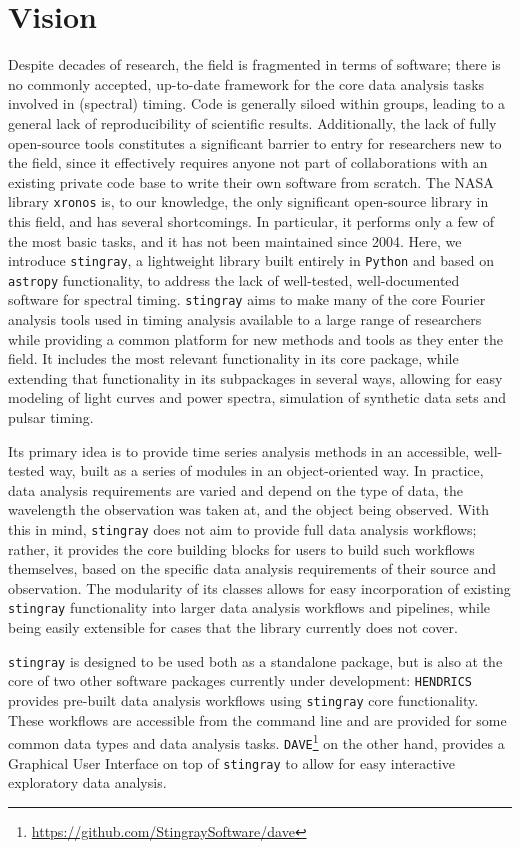 \documentclass[12pt]{emulateapj}
\newcommand{\stingray}{\texttt{stingray}\xspace}
\newcommand{\python}{\texttt{Python}\xspace}
\newcommand{\astropy}{\texttt{astropy}\xspace}
\newcommand{\hendrics}{\texttt{HENDRICS}\xspace}
\newcommand{\dave}{\texttt{DAVE}\xspace}
\begin{document}
\section{Vision}

Despite decades of research, the field is fragmented in terms of software; there is no commonly accepted, up-to-date framework for the core data analysis tasks involved in (spectral) timing. Code is generally siloed within groups, leading to a general lack of reproducibility of scientific results. Additionally, the lack of fully open-source tools constitutes a significant barrier to entry for researchers new to the field, since it effectively requires anyone not part of collaborations with an existing private code base to write their own software from scratch. 
The NASA library \texttt{xronos} is, to our knowledge, the only significant open-source library in this field, and has several shortcomings. 
In particular, it performs only a few of the most basic tasks, and it has not been maintained since 2004. 
Here, we introduce \stingray, a lightweight library built entirely in \python and based on \astropy functionality, to address the lack of well-tested, well-documented software for spectral timing. 
\stingray aims to make many of the core Fourier analysis tools used in timing analysis available to a large range of researchers while providing a common platform for new methods and tools as they enter the field. 
It includes the most relevant functionality in its core package, while extending that functionality in its subpackages in several ways, allowing for easy modeling of light curves and power spectra, simulation of synthetic data sets and pulsar timing. 

Its primary idea is to provide time series analysis methods in an accessible, well-tested way, built as a series of modules in an object-oriented way. In practice, data 
analysis requirements are varied and depend on the type of data, the wavelength the observation was taken at, and the object being observed. With this in mind, 
\stingray does not aim to provide full data analysis workflows; rather, it provides the core building blocks for users to build such workflows themselves, based on the specific data analysis requirements of their source and observation. 
The modularity of its classes allows for easy incorporation of existing \stingray functionality into larger data analysis workflows and pipelines, while being easily extensible for cases that the library currently does not cover. 

\stingray is designed to be used both as a standalone package, but is also at the core of two other software packages currently under development: \hendrics \citep{hendrics} provides pre-built data analysis workflows using \stingray core functionality. These workflows are accessible from the command line and are provided for some common data types and data analysis tasks. \dave\footnote{\url{https://github.com/StingraySoftware/dave}} on the other hand, provides a Graphical User Interface on top of \stingray to allow for easy interactive exploratory data analysis.
 
\end{document}
